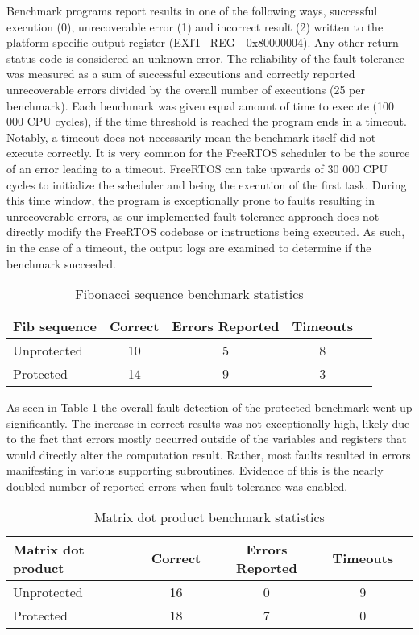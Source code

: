 Benchmark programs report results in one of the following ways, successful execution (0), unrecoverable error (1) and incorrect result (2) written to the platform specific output register (EXIT\_REG - 0x80000004). Any other return status code is considered an unknown error. The reliability of the fault tolerance was measured as a sum of successful executions and correctly reported unrecoverable errors divided by the overall number of executions (25 per benchmark). Each benchmark was given equal amount of time to execute (100 000 CPU cycles), if the time threshold is reached the program ends in a timeout. Notably, a timeout does not necessarily mean the benchmark itself did not execute correctly. It is very common for the FreeRTOS scheduler to be the source of an error leading to a timeout. FreeRTOS can take upwards of 30 000 CPU cycles to initialize the scheduler and being the execution of the first task. During this time window, the program is exceptionally prone to faults resulting in unrecoverable errors, as our implemented fault tolerance approach does not directly modify the FreeRTOS codebase or instructions being executed. As such, in the case of a timeout, the output logs are examined to determine if the benchmark succeeded. 

\begin{table}[h]
\centering
\begin{tabular}{|l|c|c|c|c|}
\hline
\textbf{Fib sequence} & \textbf{Correct} & \textbf{Errors Reported} & \textbf{Timeouts} \\
\hline
Unprotected & 10 & 5 & 8 \\
Protected & 14 & 9 & 3 \\
\hline
\end{tabular}
\caption{Fibonacci sequence benchmark statistics}
\label{tab:fib_bench}
\end{table}

As seen in Table \ref{tab:fib_bench} the overall fault detection of the protected benchmark went up significantly. The increase in correct results was not exceptionally high, likely due to the fact that errors mostly occurred outside of the variables and registers that would directly alter the computation result. Rather, most faults resulted in errors manifesting in various supporting subroutines. Evidence of this is the nearly doubled number of reported errors when fault tolerance was enabled.

\begin{table}[h]
\centering
\begin{tabular}{|l|c|c|c|c|}
\hline
\textbf{Matrix dot product} & \textbf{Correct} & \textbf{Errors Reported} & \textbf{Timeouts} \\
\hline
Unprotected & 16 & 0 & 9 \\
Protected & 18 & 7 & 0 \\
\hline
\end{tabular}
\caption{Matrix dot product benchmark statistics}
\label{tab:matrix_bench}
\end{table}


